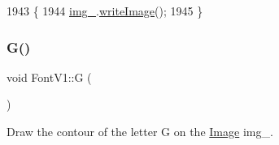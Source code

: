 \begin{DoxyCode}
1943                           \{
1944     \mbox{\hyperlink{class_font_v1_a00569e3e3c4b70f437b63f396f735fb0}{img\_}}.\mbox{\hyperlink{class_image_ac34bdffd357a50025e6a72deb02596b5}{writeImage}}();
1945 \}
\end{DoxyCode}
\mbox{\label{class_font_v1_a9806041ba05556826ba6b4a0760fcee4}} 
\subsubsection{\texorpdfstring{G()}{G()}}
{\footnotesize\ttfamily void Font\+V1\+::G (\begin{DoxyParamCaption}{ }\end{DoxyParamCaption})}



Draw the contour of the letter G on the \mbox{\hyperlink{class_image}{Image}} img\+\_\+. 


